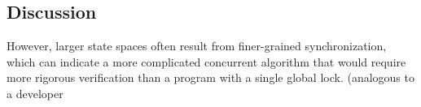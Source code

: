 \subsection{Discussion} %



However, larger state spaces often result from finer-grained synchronization,
which can indicate a more complicated concurrent algorithm that would require more rigorous verification than a program with a single global lock.
(analogous to a developer %

